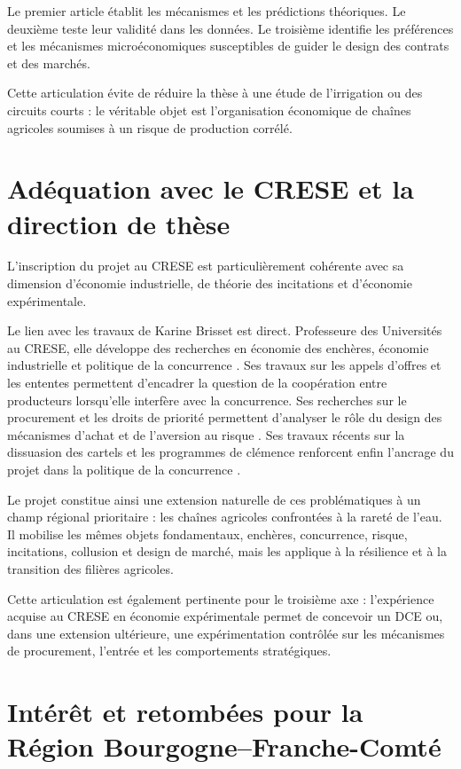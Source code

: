 \documentclass[11pt,a4paper]{article}
\begin{document}
Le premier article établit les mécanismes et les prédictions théoriques. Le deuxième teste leur validité dans les données. Le troisième identifie les préférences et les mécanismes microéconomiques susceptibles de guider le design des contrats et des marchés.

Cette articulation évite de réduire la thèse à une étude de l'irrigation ou des circuits courts : le véritable objet est l'organisation économique de chaînes agricoles soumises à un risque de production corrélé.

\section{Adéquation avec le CRESE et la direction de thèse}

L'inscription du projet au CRESE est particulièrement cohérente avec sa dimension d'économie industrielle, de théorie des incitations et d'économie expérimentale.

Le lien avec les travaux de Karine Brisset est direct. Professeure des Universités au CRESE, elle développe des recherches en économie des enchères, économie industrielle et politique de la concurrence \citep{BrissetCRESE}. Ses travaux sur les appels d'offres et les ententes permettent d'encadrer la question de la coopération entre producteurs lorsqu'elle interfère avec la concurrence. Ses recherches sur le procurement et les droits de priorité permettent d'analyser le rôle du design des mécanismes d'achat et de l'aversion au risque \citep{BrissetCochardMarechal2015}. Ses travaux récents sur la dissuasion des cartels et les programmes de clémence renforcent enfin l'ancrage du projet dans la politique de la concurrence \citep{BrissetPeterle2025}.

Le projet constitue ainsi une extension naturelle de ces problématiques à un champ régional prioritaire : les chaînes agricoles confrontées à la rareté de l'eau. Il mobilise les mêmes objets fondamentaux, enchères, concurrence, risque, incitations, collusion et design de marché, mais les applique à la résilience et à la transition des filières agricoles.

Cette articulation est également pertinente pour le troisième axe : l'expérience acquise au CRESE en économie expérimentale permet de concevoir un DCE ou, dans une extension ultérieure, une expérimentation contrôlée sur les mécanismes de procurement, l'entrée et les comportements stratégiques.

\section{Intérêt et retombées pour la Région Bourgogne--Franche-Comté}
\end{document}
